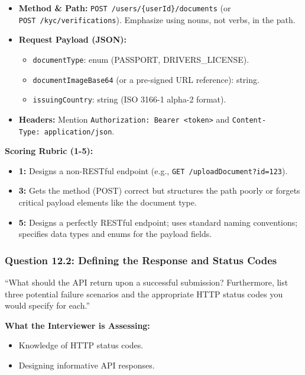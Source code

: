 \begin{itemize}
\tightlist
\item
  \textbf{Method \& Path:} \texttt{POST\ /users/\{userId\}/documents}
  (or \texttt{POST\ /kyc/verifications}). Emphasize using nouns, not
  verbs, in the path.
\item
  \textbf{Request Payload (JSON):}

  \begin{itemize}
  \tightlist
  \item
    \texttt{documentType}: enum (PASSPORT, DRIVERS\_LICENSE).
  \item
    \texttt{documentImageBase64} (or a pre-signed URL reference):
    string.
  \item
    \texttt{issuingCountry}: string (ISO 3166-1 alpha-2 format).
  \end{itemize}
\item
  \textbf{Headers:} Mention
  \texttt{Authorization:\ Bearer\ \textless{}token\textgreater{}} and
  \texttt{Content-Type:\ application/json}.
\end{itemize}

\textbf{Scoring Rubric (1-5):}

\begin{itemize}
\tightlist
\item
  \textbf{1:} Designs a non-RESTful endpoint (e.g.,
  \texttt{GET\ /uploadDocument?id=123}).
\item
  \textbf{3:} Gets the method (POST) correct but structures the path
  poorly or forgets critical payload elements like the document type.
\item
  \textbf{5:} Designs a perfectly RESTful endpoint; uses standard naming
  conventions; specifies data types and enums for the payload fields.
\end{itemize}

\subsubsection{Question 12.2: Defining the Response and Status
Codes}\label{question-12.2-defining-the-response-and-status-codes}

``What should the API return upon a successful submission? Furthermore,
list three potential failure scenarios and the appropriate HTTP status
codes you would specify for each.''

\textbf{What the Interviewer is Assessing:}

\begin{itemize}
\tightlist
\item
  Knowledge of HTTP status codes.
\item
  Designing informative API responses.
\end{itemize}

